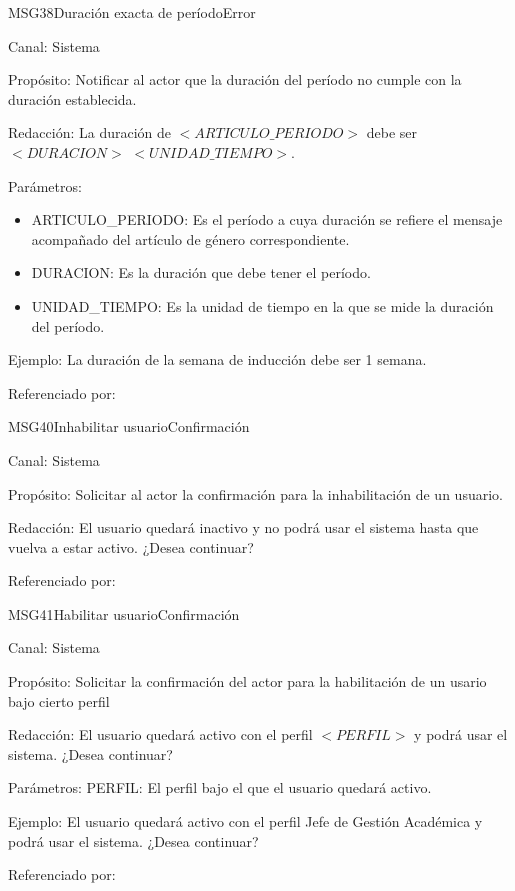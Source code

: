 \begin{mensaje}{MSG38}{Duración exacta de período}{Error}
	\item[Canal:] Sistema
	\item[Propósito:] Notificar al actor que la duración del período no cumple con la duración establecida.
	\item[Redacción:] La duración de $<ARTICULO\_PERIODO>$  debe ser $<DURACION>$ $<UNIDAD\_TIEMPO>$.
	\item[Parámetros:] 
	\begin{itemize}
		\item ARTICULO\_PERIODO: Es el período a cuya duración se refiere el mensaje acompañado del artículo de género correspondiente.
		\item DURACION: Es la duración que debe tener el período.
		\item UNIDAD\_TIEMPO: Es la unidad de tiempo en la que se mide la duración del período.
	\end{itemize}
	\item[Ejemplo:] La duración de la semana de inducción debe ser 1 semana.
	\item[Referenciado por:] 
\end{mensaje}




\begin{mensaje}{MSG40}{Inhabilitar usuario}{Confirmación}
	\item[Canal:] Sistema
	\item[Propósito:] Solicitar al actor la confirmación para la inhabilitación de un usuario.
	\item[Redacción:] El usuario quedará inactivo y no podrá usar el sistema hasta que vuelva a estar activo. ¿Desea continuar? \item[Referenciado por:] 
\end{mensaje}

\begin{mensaje}{MSG41}{Habilitar usuario}{Confirmación}
	\item[Canal:] Sistema
	\item[Propósito:] Solicitar la confirmación del actor para la habilitación de un usario bajo cierto perfil
	\item[Redacción:] El usuario quedará activo con el perfil $<PERFIL>$ y podrá usar el sistema. ¿Desea continuar?
	\item[Parámetros:] PERFIL: El perfil bajo el que el usuario quedará activo.
	\item[Ejemplo:] El usuario quedará activo con el perfil Jefe de Gestión Académica y podrá usar el sistema. ¿Desea continuar?
	\item[Referenciado por:] 
\end{mensaje}

